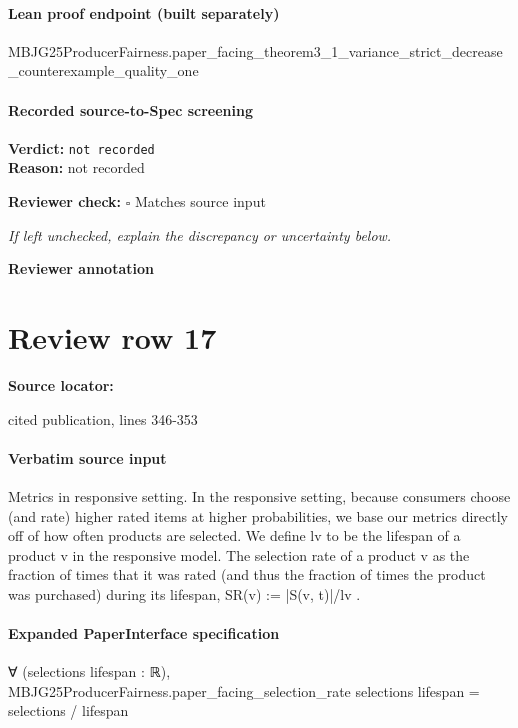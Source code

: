 \documentclass[10pt]{article}
\newcommand{\reviewerbox}{%
  \par\noindent\fbox{\parbox{0.96\linewidth}{\rule{0pt}{0.38in}}}\par
}
\newcommand{\reviewmatch}[1]{%
  \par\noindent\textbf{Reviewer check:} $\square$\; #1\par
  \noindent\emph{If left unchecked, explain the discrepancy or uncertainty below.}\par
}
\begin{document}
\paragraph{Lean proof endpoint (built separately)}\begin{ReviewVerbatim}
MBJG25ProducerFairness.paper_facing_theorem3_1_variance_strict_decrease_counterexample_quality_one
\end{ReviewVerbatim}

\paragraph{Recorded source-to-Spec screening}
\textbf{Verdict:} \texttt{not recorded}
\\
\textbf{Reason:} not recorded
\reviewmatch{Matches source input}
\noindent\textbf{Reviewer annotation}\par
\reviewerbox
\clearpage
\hypertarget{source-claim-5e3bedb3cf1d62b0}{}
\section*{Review row 17}
\textbf{Source locator:} {\footnotesize\raggedright cited publication, lines 346-\allowbreak{}353\par}
\paragraph{Verbatim source input}
\begin{ReviewVerbatim}
Metrics in responsive setting. In the responsive setting,
because consumers choose (and rate) higher rated items at
higher probabilities, we base our metrics directly off of how
often products are selected. We define lv to be the lifespan
of a product v in the responsive model. The selection rate
of a product v as the fraction of times that it was rated (and
thus the fraction of times the product was purchased) during
its lifespan, SR(v) := |S(v, t)|/lv .
\end{ReviewVerbatim}


\paragraph{Expanded PaperInterface specification}
\begin{ReviewVerbatim}
∀ (selections lifespan : ℝ),
  MBJG25ProducerFairness.paper_facing_selection_rate selections lifespan = selections / lifespan
\end{ReviewVerbatim}
\end{document}
